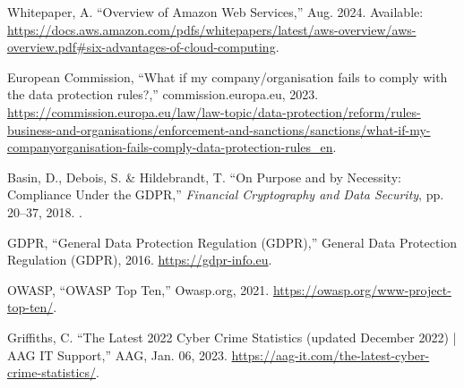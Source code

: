 \documentclass[]{project_report}
\begin{document}
\begin{thebibliography}{99}
Whitepaper, A. “Overview of Amazon Web Services,” Aug. 2024. Available: \url{https://docs.aws.amazon.com/pdfs/whitepapers/latest/aws-overview/aws-overview.pdf#six-advantages-of-cloud-computing}.

European Commission, “What if my company/organisation fails to comply with the data protection rules?,” commission.europa.eu, 2023. \url{https://commission.europa.eu/law/law-topic/data-protection/reform/rules-business-and-organisations/enforcement-and-sanctions/sanctions/what-if-my-companyorganisation-fails-comply-data-protection-rules_en}.

Basin, D., Debois, S. \& Hildebrandt, T. “On Purpose and by Necessity: Compliance Under the GDPR,” \emph{Financial Cryptography and Data Security}, pp. 20–37, 2018. .

GDPR, “General Data Protection Regulation (GDPR),” General Data Protection Regulation (GDPR), 2016. \url{https://gdpr-info.eu}.

OWASP, “OWASP Top Ten,” Owasp.org, 2021. \url{https://owasp.org/www-project-top-ten/}.

Griffiths, C. “The Latest 2022 Cyber Crime Statistics (updated December 2022) | AAG IT Support,” AAG, Jan. 06, 2023. \url{https://aag-it.com/the-latest-cyber-crime-statistics/}.


\end{thebibliography}
\label{endpage}
\end{document}
